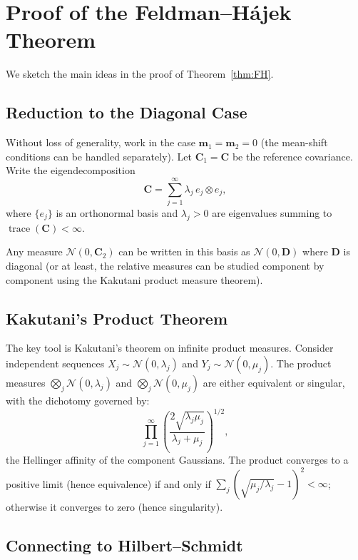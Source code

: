 \documentclass[12pt, oneside]{book}
\theoremstyle{plain}
\theoremstyle{definition}
\newcommand{\calN}{\mathcal{N}}
\DeclareMathOperator{\trace}{trace}
\begin{document}
\chapter{Proof of the Feldman--H\'ajek Theorem}
\label{app:FH_proof}

We sketch the main ideas in the proof of Theorem~\ref{thm:FH}.

\section{Reduction to the Diagonal Case}

Without loss of generality, work in the case $\mathbf{m}_1 = \mathbf{m}_2 = 0$ (the mean-shift conditions can be handled separately). Let $\mathbf{C}_1 = \mathbf{C}$ be the reference covariance. Write the eigendecomposition
\begin{equation}
\mathbf{C} = \sum_{j=1}^{\infty} \lambda_j \, e_j \otimes e_j,
\end{equation}
where $\{e_j\}$ is an orthonormal basis and $\lambda_j > 0$ are eigenvalues summing to $\trace(\mathbf{C}) < \infty$.

Any measure $\calN(0, \mathbf{C}_2)$ can be written in this basis as $\calN(0, \mathbf{D})$ where $\mathbf{D}$ is diagonal (or at least, the relative measures can be studied component by component using the Kakutani product measure theorem).

\section{Kakutani's Product Theorem}

The key tool is Kakutani's theorem on infinite product measures. Consider independent sequences $X_j \sim \calN(0, \lambda_j)$ and $Y_j \sim \calN(0, \mu_j)$. The product measures $\bigotimes_j \calN(0, \lambda_j)$ and $\bigotimes_j \calN(0, \mu_j)$ are either equivalent or singular, with the dichotomy governed by:
\begin{equation}
\prod_{j=1}^{\infty} \left(\frac{2\sqrt{\lambda_j \mu_j}}{\lambda_j + \mu_j}\right)^{1/2},
\end{equation}
the Hellinger affinity of the component Gaussians. The product converges to a positive limit (hence equivalence) if and only if $\sum_j (\sqrt{\mu_j/\lambda_j} - 1)^2 < \infty$; otherwise it converges to zero (hence singularity).

\section{Connecting to Hilbert--Schmidt}
\end{document}
